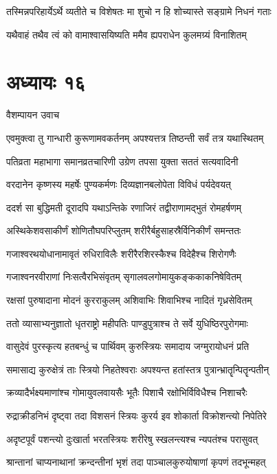 \twolineshloka
{तस्मिन्नपरिहार्येऽर्थे व्यतीते च विशेषतः}
{मा शुचो न हि शोच्यास्ते सङ्ग्रामे निधनं गताः}


\twolineshloka
{यथैवाहं तथैव त्वं को वामाश्वासयिष्यति}
{ममैव ह्यपराधेन कुलमग्र्यं विनाशितम्}


\chapter{अध्यायः १६}
\twolineshloka
{वैशम्पायन उवाच}
{}


\twolineshloka
{एवमुक्त्वा तु गान्धारी कुरूणामवकर्तनम्}
{अपश्यत्तत्र तिष्ठन्ती सर्वं तत्र यथास्थितम्}


\twolineshloka
{पतिव्रता महाभागा समानव्रतचारिणी}
{उग्रेण तपसा युक्ता सततं सत्यवादिनी}


\twolineshloka
{वरदानेन कृष्णस्य महर्षेः पुण्यकर्मणः}
{दिव्यज्ञानबलोपेता विविधं पर्यदेवयत्}


\twolineshloka
{ददर्श सा बुद्धिमती दूरादपि यथाऽन्तिके}
{रणाजिरं तद्वीराणामद्भुतं रोमहर्षणम्}


\twolineshloka
{अस्थिकेशवसाकीर्णं शोणितौघपरिप्लुतम्}
{शरीरैर्बहुसाहस्रैर्विनिकीर्णं समन्ततः}


\twolineshloka
{गजाश्वरथयोधानामावृतं रुधिराविलैः}
{शरीरैरशिरस्कैश्च विदेहैश्च शिरोगणैः}


\twolineshloka
{गजाश्वनरवीराणां निःसत्वैरभिसंवृतम्}
{सृगालवलगोमायुकङ्ककाकनिषेवितम्}


\twolineshloka
{रक्षसां पुरुषादाना मोदनं कुरराकुलम्}
{अशिवाभिः शिवाभिश्च नादितं गृध्रसेवितम्}


\twolineshloka
{ततो व्यासाभ्यनुज्ञातो धृतराष्ट्रो महीपतिः}
{पाण्डुपुत्राश्च ते सर्वे युधिष्ठिरपुरोगमाः}


\twolineshloka
{वासुदेवं पुरस्कृत्य हतबन्धुं च पार्थिवम्}
{कुरुस्त्रियः समादाय जग्मुरायोधनं प्रति}


\twolineshloka
{समासाद्य कुरुक्षेत्रं ताः स्त्रियो निहतेश्वराः}
{अपश्यन्त हतांस्तत्र पुत्रान्भ्रातॄन्पितॄन्पतीन्}


\twolineshloka
{क्रव्यादैर्भक्ष्यमाणांश्च गोमायुवलवायसैः}
{भूतैः पिशाचै रक्षोभिर्विविधैश्च निशाचरैः}


\twolineshloka
{रुद्राक्रीडनिभं दृष्ट्वा तदा विशसनं स्त्रियः}
{कुरर्य इव शोकार्ता विक्रोशन्त्यो निपेतिरे}


\twolineshloka
{अदृष्टपूर्वं पशन्त्यो दुःखार्ता भरतस्त्रियः}
{शरीरेषु स्खलन्त्यश्च न्यपतंश्च परासुवत्}


\twolineshloka
{श्रान्तानां चाप्यनाथानां क्रन्दन्तीनां भृशं तदा}
{पाञ्चालकुरुयोषाणां कृपणं तदभून्महत्}


